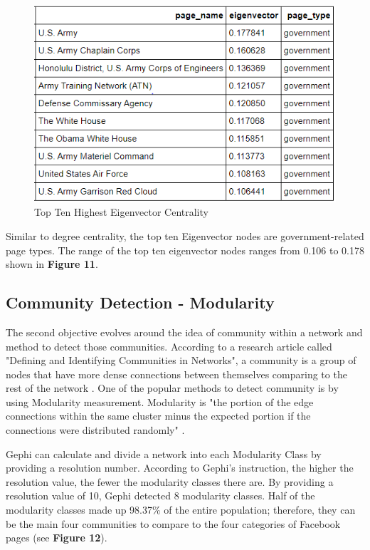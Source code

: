 \documentclass[11pt,twocolumn]{article}
\begin{document}
\begin{figure}[hbt!]
\includegraphics[scale=0.4]{top_ten_eigenvector.png} 
\caption{Top Ten Highest Eigenvector Centrality}
\end{figure}

Similar to degree centrality, the top ten Eigenvector nodes are government-related page types.  The range of the top ten eigenvector nodes ranges from 0.106 to 0.178 shown in \textbf{Figure 11}.

\subsection{Community Detection - Modularity}
The second objective evolves around the idea of community within a network and method to detect those communities. According to a research article called "Defining and Identifying Communities in Networks", a community is a group of nodes that have more dense connections between themselves comparing to the rest of the network \cite{Radicchi2658}. One of the popular methods to detect community is by using Modularity measurement. Modularity is "the portion of the edge connections within the same cluster minus the expected portion if the connections were distributed randomly" \cite{li_modular}.

Gephi can calculate and divide a network into each Modularity Class by providing a resolution number. According to Gephi's instruction, the higher the resolution value, the fewer the modularity classes there are. By providing a resolution value of 10, Gephi detected 8 modularity classes. Half of the modularity classes made up 98.37\% of the entire population; therefore, they can be the main four communities to compare to the four categories of Facebook pages (see \textbf{Figure 12}). 
\end{document}

